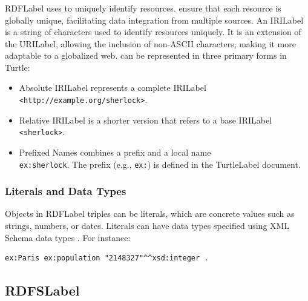 \subsubsection{}\label{II-subsubsec:iri}

\acrshort{RDFLabel} uses  to uniquely identify resources.  ensure that each resource is globally unique, facilitating data integration from multiple sources. An \acrshort{IRILabel} is a string of characters used to identify resources uniquely. It is an extension of the \acrfull{URILabel}, allowing the inclusion of non-ASCII characters, making it more adaptable to a globalized web.  can be represented in three primary forms in Turtle:

\begin{itemize}
    \item Absolute \acrshort{IRILabel} represents a complete \acrshort{IRILabel} \\
    \texttt{<http://example.org/sherlock>}.
    \item Relative \acrshort{IRILabel} is a shorter version that refers to a base \acrshort{IRILabel} \\
    \texttt{<sherlock>}.
    \item Prefixed Names combines a prefix and a local name \\
    \texttt{ex:sherlock}. The prefix (e.g., \texttt{ex:}) is defined in the \acrshort{TurtleLabel} document.
\end{itemize}

\subsubsection{Literals and Data Types}\label{II-subsubsec:literals}

Objects in \acrshort{RDFLabel} triples can be literals, which are concrete values such as strings, numbers, or dates. Literals can have data types specified using XML Schema data types \cite{paulv.bironXMLSchemaPart2004}. For instance:

\begin{lstlisting}[caption=Example triple in Turtle with an integer literal, label={lst:integer-literal}]
ex:Paris ex:population "2148327"^^xsd:integer .
\end{lstlisting}

\subsection{\acrfull{RDFSLabel}}\label{II-subsec:rdfs}


